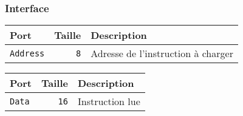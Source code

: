 \documentclass{article}
\begin{document}
    \subsubsection{Interface}


    \begin{tabular}{|l|r|l|}
        \hline
        \textbf{Port}   & \textbf{Taille} & \textbf{Description}               \\
        \hline

        \texttt{Address} & \texttt{8}      & Adresse de l'instruction à charger \\

        \hline
    \end{tabular}


    \begin{tabular}{|l|r|l|}
        \hline
        \textbf{Port}   & \textbf{Taille} & \textbf{Description} \\
        \hline

        \texttt{Data} & \texttt{16}     & Instruction lue      \\

        \hline
    \end{tabular}


\end{document}
